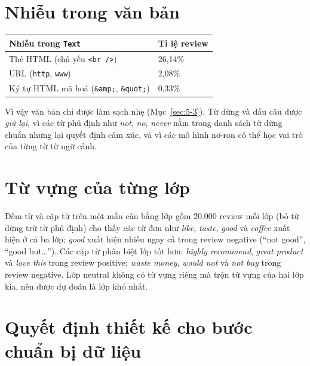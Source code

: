 \section{Nhiễu trong văn bản}
\label{sec:4-7}

\begin{center}
\begin{tabular}{@{}p{8cm}p{3cm}@{}}
    \toprule
    Nhiễu trong \texttt{Text} & Tỉ lệ review \\
    \midrule
    Thẻ HTML (chủ yếu \texttt{<br />}) & 26,14\% \\
    URL (\texttt{http}, \texttt{www}) & 2,08\% \\
    Ký tự HTML mã hoá (\texttt{\&amp;}, \texttt{\&quot;}) & 0,33\% \\
    \bottomrule
\end{tabular}
\end{center}

Vì vậy văn bản chỉ được làm sạch nhẹ (Mục~\ref{sec:5-3}). Từ dừng và dấu câu được \emph{giữ lại}, vì các từ phủ định như \emph{not}, \emph{no}, \emph{never} nằm trong danh sách từ dừng chuẩn nhưng lại quyết định cảm xúc, và vì các mô hình nơ-ron có thể học vai trò của từng từ từ ngữ cảnh.

\section{Từ vựng của từng lớp}
\label{sec:4-8}

Đếm từ và cặp từ trên một mẫu cân bằng lớp gồm 20.000 review mỗi lớp (bỏ từ dừng trừ từ phủ định) cho thấy các từ đơn như \emph{like}, \emph{taste}, \emph{good} và \emph{coffee} xuất hiện ở cả ba lớp; \emph{good} xuất hiện nhiều ngay cả trong review negative (``not good'', ``good but\ldots''). Các cặp từ phân biệt lớp tốt hơn: \emph{highly recommend}, \emph{great product} và \emph{love this} trong review positive; \emph{waste money}, \emph{would not} và \emph{not buy} trong review negative. Lớp neutral không có từ vựng riêng mà trộn từ vựng của hai lớp kia, nên được dự đoán là lớp khó nhất.

\section{Quyết định thiết kế cho bước chuẩn bị dữ liệu}
\label{sec:4-9}

